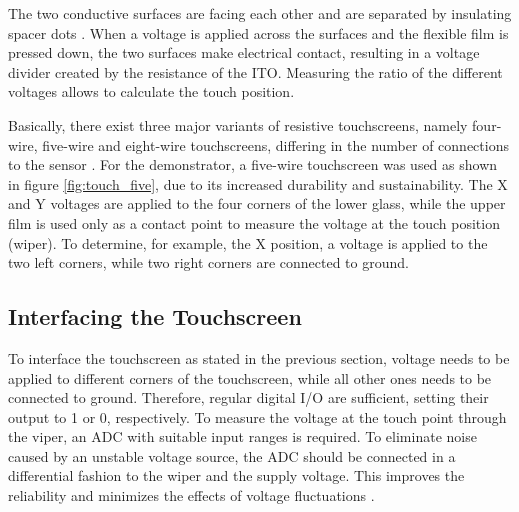The two conductive surfaces are facing each other and
are separated by insulating spacer dots \citep{Wal12}. When a voltage is
applied across the surfaces and the flexible film is pressed down, the two
surfaces make electrical contact, resulting in a voltage divider created by
the resistance of the \ac{ITO}. Measuring the ratio of the different voltages
allows to calculate the touch position.

Basically, there exist three major variants of resistive touchscreens, namely
four-wire, five-wire and eight-wire touchscreens, differing in the number of
connections to the sensor \citep{Wal12}. For the demonstrator, a five-wire
touchscreen was used as shown in figure \ref{fig:touch_five}, due to its
increased durability and sustainability. The X and Y voltages are applied to
the four corners of the lower glass, while the upper film is used only as a
contact point to measure the voltage at the touch position (wiper). To
determine, for example, the X position, a voltage is applied to the two left
corners, while two right corners are connected to ground.

\subsection{Interfacing the Touchscreen}
To interface the touchscreen as stated in the previous section, voltage needs
to be applied to different corners of the touchscreen, while all other ones
needs to be connected to ground. Therefore, regular digital I/O are
sufficient, setting their output to 1 or 0, respectively. To measure the
voltage at the touch point through the viper, an \ac{ADC} with suitable input
ranges is required. To eliminate noise caused by an unstable voltage source,
the \ac{ADC} should be connected in a differential fashion to the wiper and
the supply voltage. This improves the reliability and minimizes the effects of
voltage fluctuations \citep{OOD00}.

